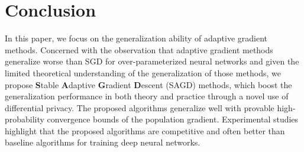 \documentclass[11pt]{article}
\begin{document}
\section{Conclusion}\label{sec: conclusion}
\vspace{-0.05in}

In this paper, we focus on the generalization ability of adaptive gradient methods. 
Concerned with the observation that adaptive gradient methods generalize worse than SGD for over-parameterized neural networks and given the limited theoretical understanding of the generalization of those methods,
we propose \textbf{S}table \textbf{A}daptive \textbf{G}radient \textbf{D}escent (\textsc{SAGD}) methods, which boost the generalization performance in both theory and practice through a novel use of differential privacy. 
The proposed algorithms generalize well with provable high-probability convergence bounds of the population gradient. 
Experimental studies highlight that the proposed algorithms are competitive and often better than baseline algorithms for training deep neural networks. 


\clearpage




\clearpage


\appendix


\end{document}
